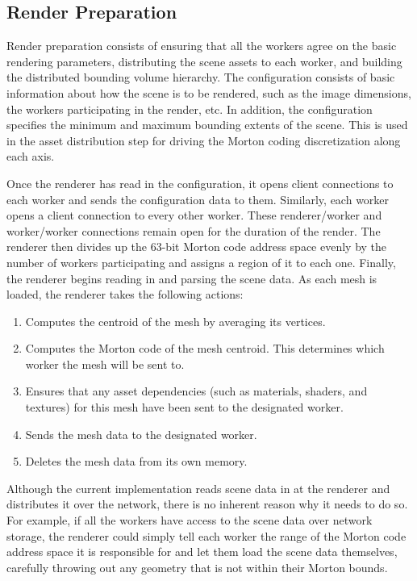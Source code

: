 \documentclass[a4paper,twoside]{article}
\begin{document}
\subsection{Render Preparation}
\label{prep}

Render preparation consists of ensuring that all the workers agree on the
basic rendering parameters, distributing the scene assets to each worker, and
building the distributed bounding volume hierarchy. 
The configuration consists of basic information about how the scene is to be
rendered, such as the image dimensions, the workers participating in the render,
etc. In addition, the configuration specifies the minimum and maximum bounding
extents of the scene. This is used in the asset distribution step for driving
the Morton coding discretization along each axis.

Once the renderer has read in the configuration, it opens client connections
to each worker and sends the configuration data to them. Similarly, each worker
opens a client connection to every other worker. These renderer/worker and
worker/worker connections remain open for the duration of the render.
The renderer then divides up the 63-bit Morton code address space evenly by the
number of workers participating and assigns a region of it to each one.  Finally, the renderer begins reading in and parsing the scene data. As each mesh
is loaded, the renderer takes the following actions:

\begin{enumerate}
   \item Computes the centroid of the mesh by averaging its vertices.
   \item Computes the Morton code of the mesh centroid. This determines
      which worker the mesh will be sent to.
   \item Ensures that any asset dependencies (such as materials,
      shaders, and textures) for this mesh have been sent to the designated worker.
   \item Sends the mesh data to the designated worker.
   \item Deletes the mesh data from its own memory.
\end{enumerate}

Although the current implementation reads scene data in at the renderer
and distributes it over the network, there is no inherent reason why it needs to
do so. For example, if all the workers have access to the scene data over network
storage, the renderer could simply tell each worker the range of the Morton code
address space it is responsible for and let them load the scene data themselves,
carefully throwing out any geometry that is not within their Morton bounds.
\end{document}
